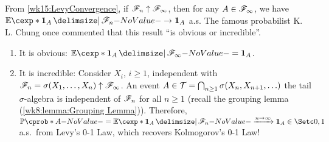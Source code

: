\documentclass[12pt]{article}
\begin{document}
\begin{Example}
From \cref{wk15:LevyConvergence}, if $\mathscr{F}_n \uparrow \mathscr{F}_\infty$, then for any $A\in\mathscr{F}_\infty$, we have $\E[\indicatore{A} \given \scF_n] \to \indicatore{A}$ a.s. The famous probabilist K. L. Chung once commented that this result ``is obvious or incredible''. 
\begin{enumerate}
	\item It is obvious: $\E[\indicatore{A} \given \scF_\infty] = \indicatore{A}$.
	\item It is incredible: Consider $X_i$, $i\geq1$, independent with $\mathscr{F}_n=\sigma(X_1,\ldots,X_n) \uparrow \mathscr{F}_\infty$. An event $A \in \mathcal{T} = \bigcap_{n\geq1} \sigma(X_n,X_{n+1},\ldots)$ the tail $\sigma$-algebra is independent of $\mathscr{F}_n$ for all $n\geq1$ (recall the grouping lemma (\cref{wk8:lemma:Grouping Lemma})). Therefore, $\P(A) = \E[\indicatore{A} \given \scF_n] \xrightarrow{n\to\infty} \indicatore{A}\in\set{0,1}$ a.s.\ from Levy's 0-1 Law, which recovers Kolmogorov's 0-1 Law!
\end{enumerate}

\end{Example}

%

\end{document}
